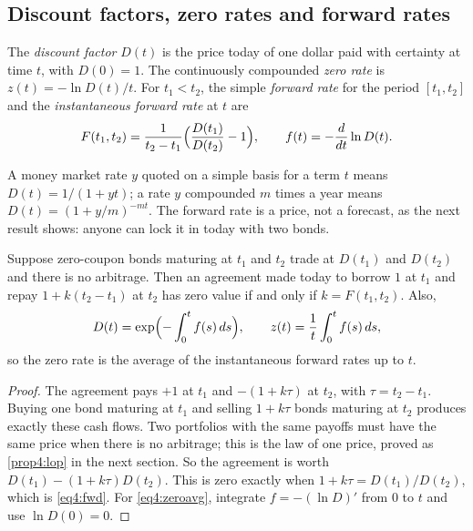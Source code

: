 \begin{chapterrefs}
\section{Discount factors, zero rates and forward rates}
\label{sec4:curve}

\begin{definition}\label{def4:curve}
The \emph{discount factor} $D(t)$ is the price today of one dollar paid with certainty at time $t$,
with $D(0)=1$. The continuously compounded \emph{zero rate} is $z(t)=-\ln D(t)/t$. For $t_1<t_2$, the
simple \emph{forward rate} for the period $[t_1,t_2]$ and the \emph{instantaneous forward rate} at $t$
are
\begin{equation}\label{eq4:fwd}
  F(t_1,t_2)=\frac{1}{t_2-t_1}\Bigl(\frac{D(t_1)}{D(t_2)}-1\Bigr),\qquad
  f(t)=-\frac{d}{dt}\ln D(t).
\end{equation}
\end{definition}

A money market rate $y$ quoted on a simple basis for a term $t$ means $D(t)=1/(1+yt)$; a rate $y$
compounded $m$ times a year means $D(t)=(1+y/m)^{-mt}$. The forward rate is a price, not a forecast,
as the next result shows: anyone can lock it in today with two bonds.

\begin{proposition}\label{prop4:fra}
Suppose zero-coupon bonds maturing at $t_1$ and $t_2$ trade at $D(t_1)$ and $D(t_2)$ and there is no
arbitrage. Then an agreement made today to borrow $1$ at $t_1$ and repay $1+k(t_2-t_1)$ at $t_2$ has
zero value if and only if $k=F(t_1,t_2)$. Also,
\begin{equation}\label{eq4:zeroavg}
  D(t)=\exp\Bigl(-\int_0^t f(s)\,ds\Bigr),\qquad z(t)=\frac1t\int_0^t f(s)\,ds ,
\end{equation}
so the zero rate is the average of the instantaneous forward rates up to $t$.
\end{proposition}

\begin{proof}
The agreement pays $+1$ at $t_1$ and $-(1+k\tau)$ at $t_2$, with $\tau=t_2-t_1$. Buying one bond
maturing at $t_1$ and selling $1+k\tau$ bonds maturing at $t_2$ produces exactly these cash flows.
Two portfolios with the same payoffs must have the same price when there is no arbitrage; this is the
law of one price, proved as \cref{prop4:lop} in the next section. So the agreement is worth
$D(t_1)-(1+k\tau)D(t_2)$. This is zero exactly when $1+k\tau=D(t_1)/D(t_2)$, which is
\cref{eq4:fwd}. For \cref{eq4:zeroavg}, integrate $f=-(\ln D)'$ from $0$ to $t$ and use $\ln D(0)=0$.
\end{proof}


\end{chapterrefs}
